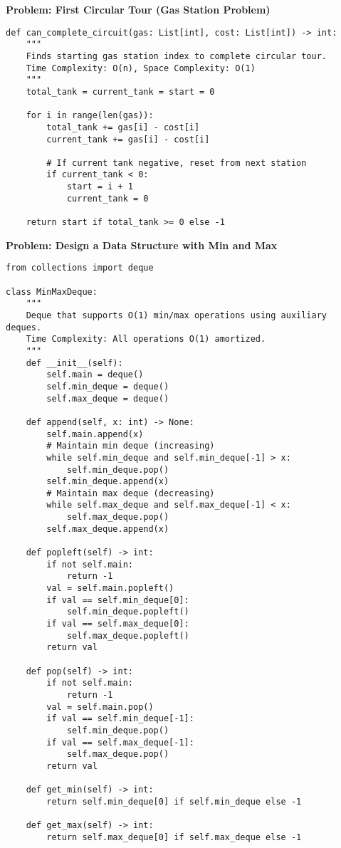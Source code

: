 \noindent\textbf{Problem: First Circular Tour (Gas Station Problem)}
\begin{verbatim}
def can_complete_circuit(gas: List[int], cost: List[int]) -> int:
    """
    Finds starting gas station index to complete circular tour.
    Time Complexity: O(n), Space Complexity: O(1)
    """
    total_tank = current_tank = start = 0
    
    for i in range(len(gas)):
        total_tank += gas[i] - cost[i]
        current_tank += gas[i] - cost[i]
        
        # If current tank negative, reset from next station
        if current_tank < 0:
            start = i + 1
            current_tank = 0
    
    return start if total_tank >= 0 else -1
\end{verbatim}

\noindent\textbf{Problem: Design a Data Structure with Min and Max}
\begin{verbatim}
from collections import deque

class MinMaxDeque:
    """
    Deque that supports O(1) min/max operations using auxiliary deques.
    Time Complexity: All operations O(1) amortized.
    """
    def __init__(self):
        self.main = deque()
        self.min_deque = deque()
        self.max_deque = deque()

    def append(self, x: int) -> None:
        self.main.append(x)
        # Maintain min deque (increasing)
        while self.min_deque and self.min_deque[-1] > x:
            self.min_deque.pop()
        self.min_deque.append(x)
        # Maintain max deque (decreasing)
        while self.max_deque and self.max_deque[-1] < x:
            self.max_deque.pop()
        self.max_deque.append(x)

    def popleft(self) -> int:
        if not self.main:
            return -1
        val = self.main.popleft()
        if val == self.min_deque[0]:
            self.min_deque.popleft()
        if val == self.max_deque[0]:
            self.max_deque.popleft()
        return val

    def pop(self) -> int:
        if not self.main:
            return -1
        val = self.main.pop()
        if val == self.min_deque[-1]:
            self.min_deque.pop()
        if val == self.max_deque[-1]:
            self.max_deque.pop()
        return val

    def get_min(self) -> int:
        return self.min_deque[0] if self.min_deque else -1

    def get_max(self) -> int:
        return self.max_deque[0] if self.max_deque else -1
\end{verbatim}

% 
